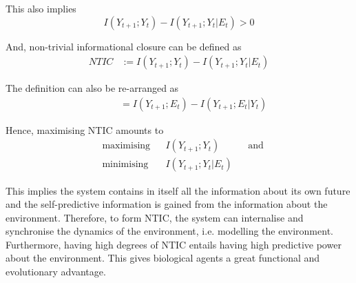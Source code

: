 \documentclass[utf8]{article}
\begin{document}
			\noindent
			This also implies
				\begin{equation}
					I(Y_{t+1};Y_{t})-I(Y_{t+1};Y_{t}|E_{t}) > 0
				\end{equation}



			\noindent
			And, non-trivial informational closure can be defined as
				\begin{equation}
				\label{eq:NTIC}
    				\left.\begin{array}
    				{rl}{NTIC} & {:=I(Y_{t+1};Y_{t})-I(Y_{t+1};Y_{t}|E_{t})}
    				\end{array} \right.
				\end{equation}
				
				
			\noindent
            The definition can also be re-arranged as 
				\begin{equation}
				\label{eq:NTIC2}
    				\left.\begin{array}
    				{rl}{\qquad} & {\ =I(Y_{t+1};E_{t})-I(Y_{t+1};E_{t}|Y_{t})}
    				\end{array} \right.
				\end{equation}				

			\noindent
			Hence, maximising NTIC amounts to
				\begin{equation}
    				\label{eq:nticObjective}
    				\begin{aligned}
    				& \text{maximising} & { } & I(Y_{t+1};Y_{t}) & { } & \text{and} \\
    				& \text{minimising} & { } & I(Y_{t+1};Y_{t}|E_{t}) & { }
    				\end{aligned}
				\end{equation}

			\noindent
			This implies the system contains in itself all the information about its own future and the self-predictive information is gained from the information about the environment. Therefore, to form NTIC, the system can internalise and synchronise the dynamics of the environment, i.e. modelling the environment. Furthermore, having high degrees of NTIC entails having high predictive power about the environment. This gives biological agents a great functional and evolutionary advantage. 
			
\end{document}
